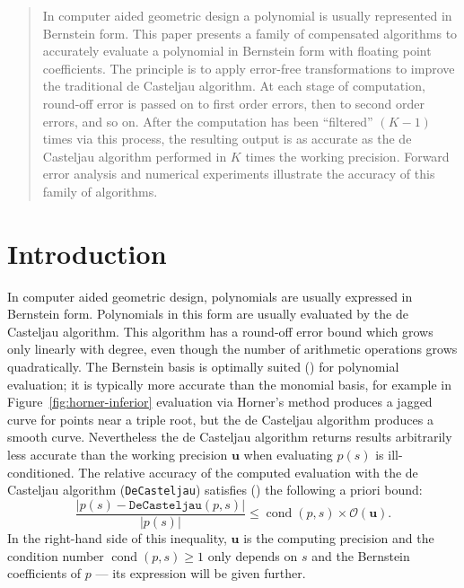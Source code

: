 \documentclass[letterpaper,10pt]{article}
\theoremstyle{definition}
\newcommand{\cond}[1]{\operatorname{cond}\left(#1\right)}
\newcommand{\mach}{\mathbf{u}}
\begin{document}
\begin{abstract}
In computer aided geometric design a polynomial is usually represented in
Bernstein form. This paper presents a family of compensated algorithms to
accurately evaluate a polynomial in Bernstein form with floating point
coefficients. The principle is to apply error-free transformations to
improve the traditional de Casteljau algorithm. At each stage of computation,
round-off error is passed on to first order errors, then to second order
errors, and so on. After the computation has been ``filtered'' \((K - 1)\)
times via this process, the resulting output is as accurate as the de Casteljau
algorithm performed in \(K\) times the working precision. Forward error
analysis and numerical experiments illustrate the accuracy of this family
of algorithms.
\end{abstract}

\tableofcontents

\section{Introduction}

In computer aided geometric design, polynomials are usually expressed in
Bernstein form. Polynomials in this form are usually evaluated by the
de Casteljau algorithm. This algorithm has a round-off error bound
which grows only linearly with degree, even though the number of
arithmetic operations grows quadratically. The Bernstein basis is
optimally suited (\cite{Farouki1987}) for polynomial evaluation; it is
typically more accurate than the monomial basis, for example in
Figure~\ref{fig:horner-inferior} evaluation via Horner's method produces
a jagged curve for points near a triple root, but the de Casteljau algorithm
produces a smooth curve. Nevertheless the de Casteljau
algorithm returns results arbitrarily less accurate than the working
precision \(\mach\) when evaluating \(p(s)\) is ill-conditioned.
The relative accuracy of the computed
evaluation with the de Casteljau algorithm (\texttt{DeCasteljau}) satisfies
(\cite{Mainar1999}) the following a priori bound:
\begin{equation}\label{de-casteljau-error}
  \frac{\left|p(s) - \mathtt{DeCasteljau}(p, s)\right|}{\left|p(s)\right|} \leq
  \cond{p, s} \times \mathcal{O}(\mach).
\end{equation}
In the right-hand side of this inequality, \(\mach\) is the computing
precision and the condition number \(\cond{p, s} \geq 1\) only depends
on \(s\) and the Bernstein coefficients of \(p\) --- its expression will
be given further.
\end{document}
